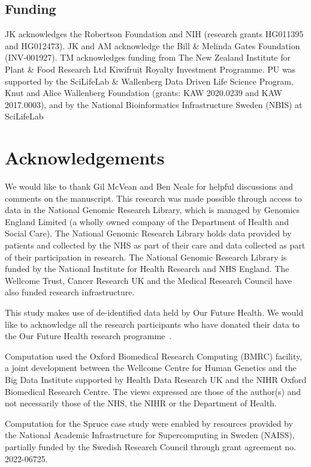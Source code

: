 \documentclass[a4paper,num-refs]{oup-contemporary}
\begin{document}
\subsection{Funding}
JK acknowledges the Robertson Foundation and
NIH (research grants HG011395 and HG012473).
JK and AM acknowledge the Bill \& Melinda Gates Foundation (INV-001927).
TM acknowledges funding from The New Zealand Institute for Plant \& Food
Research Ltd Kiwifruit Royalty Investment Programme.
PU was supported by the SciLifeLab \& Wallenberg Data Driven Life
Science Program, Knut and Alice Wallenberg Foundation (grants: KAW
2020.0239 and KAW 2017.0003), and by the National Bioinformatics
Infrastructure Sweden (NBIS) at SciLifeLab

\section{Acknowledgements}
We would like to thank Gil McVean and Ben Neale for helpful discussions and
comments on the manuscript.
This research was made possible through access to data in the National Genomic
Research Library, which is managed by Genomics England Limited (a wholly owned
company of the Department of Health and Social Care). The National Genomic
Research Library holds data provided by patients and collected by the NHS as
part of their care and data collected as part of their participation in
research. The National Genomic Research Library is funded by the National
Institute for Health Research and NHS England. The Wellcome Trust, Cancer
Research UK and the Medical Research Council have also funded research
infrastructure.

This study makes use of de-identified data held by Our Future Health.
We would like to acknowledge all the research participants who have donated
their data to the Our Future Health research programme~\cite{ofhpubpolicy}.

Computation used the Oxford Biomedical Research Computing (BMRC) facility, a
joint development between the Wellcome Centre for Human Genetics and the Big
Data Institute supported by Health Data Research UK and the NIHR Oxford
Biomedical Research Centre. The views expressed are those of the author(s) and
not necessarily those of the NHS, the NIHR or the Department of Health.

Computation for the Spruce case study were enabled by resources
provided by the National Academic Infrastructure for Supercomputing in
Sweden (NAISS), partially funded by the Swedish Research Council
through grant agreement no. 2022-06725.
\end{document}
